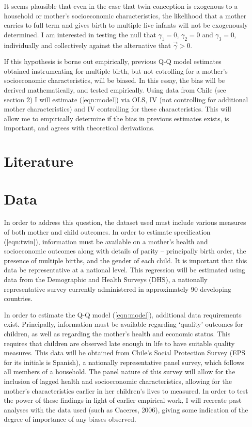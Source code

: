\documentclass{article}[11pt,subeqn]
\begin{document}
\begin{spacing}{1.25}
It seems plausible that even in the case that twin conception is exogenous to a household or mother's
socioeconomic characteristics, the likelihood that a mother carries to full term and gives birth to
multiple live infants will not be exogenously determined.  I am interested in testing the null that
$\gamma_1=0$, $\gamma_2=0$ and $\gamma_3=0$, individually and collectively against the alternative
that $\vec{\gamma}>0$.

If this hypothesis is borne out empirically, previous Q-Q model estimates obtained instrumenting for
multiple birth, but not cotrolling for a mother's socioeconomic characteristics, will be biased. In this
essay, the bias will be derived mathematically, and tested empirically.  Using data from Chile (see
section \ref{scn:data}) I will estimate (\ref{eqn:model}) via OLS, IV (not controlling for additional
mother characteristics) and IV controlling for these characteristics.  This will allow me to empirically
determine if the bias in previous estimates exists, is important, and agrees with theoretical
derivations.
\vspace{-5mm}
\section{Literature}
\label{scn:lit}
\vspace{-5mm}

\section{Data}
\label{scn:data}
\vspace{-5mm}
In order to address this question, the dataset used must include various measures of both mother and child
outcomes. In order to estimate specification (\ref{eqn:twin}), information must be available on a mother's
health and socioeconomic outcomes along with details of parity -- principally birth order, the presence
of multiple births, and the gender of each child.  It is important that this data be representative at a
national level.  This regression will be estimated using data from the Demographic and Health Surveys (DHS),
a nationally representative survey currently administered in approximately 90 developing countries.

In order to estimate the Q-Q model (\ref{eqn:model}), additional data requirements exist.  Principally,
information must be available regarding `quality' outcomes for children, as well as regarding the mother's
health and economic status.  This requires that children are observed late enough in life to have suitable
quality measures.  This data will be obtained from Chile's Social Protection Survey (EPS for its initials
is Spanish), a nationally representative panel survey, which follows all members of a household.  The panel
nature of this survey will allow for the inclusion of lagged health and socioeconomic characteristics,
allowing for the mother's characteristics earlier in her children's lives to measured.  In order to test
the power of these findings in light of earlier empirical work, I will recreate past analyses with the
data used (such as Caceres, 2006), giving some indication of the degree of importance of any biases observed.


\end{spacing}
\end{document}
